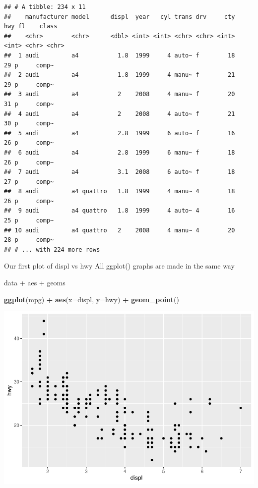 \documentclass[
]{article}
\newenvironment{Shaded}{\begin{snugshade}}{\end{snugshade}}
\newcommand{\DataTypeTok}[1]{\textcolor[rgb]{0.13,0.29,0.53}{#1}}
\newcommand{\KeywordTok}[1]{\textcolor[rgb]{0.13,0.29,0.53}{\textbf{#1}}}
\newcommand{\NormalTok}[1]{#1}
\newcommand{\OperatorTok}[1]{\textcolor[rgb]{0.81,0.36,0.00}{\textbf{#1}}}
\newcommand{\StringTok}[1]{\textcolor[rgb]{0.31,0.60,0.02}{#1}}
\begin{document}
\begin{verbatim}
## # A tibble: 234 x 11
##    manufacturer model      displ  year   cyl trans drv     cty   hwy fl    class
##    <chr>        <chr>      <dbl> <int> <int> <chr> <chr> <int> <int> <chr> <chr>
##  1 audi         a4           1.8  1999     4 auto~ f        18    29 p     comp~
##  2 audi         a4           1.8  1999     4 manu~ f        21    29 p     comp~
##  3 audi         a4           2    2008     4 manu~ f        20    31 p     comp~
##  4 audi         a4           2    2008     4 auto~ f        21    30 p     comp~
##  5 audi         a4           2.8  1999     6 auto~ f        16    26 p     comp~
##  6 audi         a4           2.8  1999     6 manu~ f        18    26 p     comp~
##  7 audi         a4           3.1  2008     6 auto~ f        18    27 p     comp~
##  8 audi         a4 quattro   1.8  1999     4 manu~ 4        18    26 p     comp~
##  9 audi         a4 quattro   1.8  1999     4 auto~ 4        16    25 p     comp~
## 10 audi         a4 quattro   2    2008     4 manu~ 4        20    28 p     comp~
## # ... with 224 more rows
\end{verbatim}

Our first plot of displ vs hwy All ggplot() graphs are made in the same
way

data + aes + geoms

\begin{Shaded}
\begin{Highlighting}[]
\KeywordTok{ggplot}\NormalTok{(mpg) }\OperatorTok{+}\StringTok{ }
\StringTok{  }\KeywordTok{aes}\NormalTok{(}\DataTypeTok{x=}\NormalTok{displ, }\DataTypeTok{y=}\NormalTok{hwy) }\OperatorTok{+}\StringTok{ }
\StringTok{  }\KeywordTok{geom_point}\NormalTok{()}
\end{Highlighting}
\end{Shaded}

\includegraphics{class05_files/figure-latex/unnamed-chunk-3-1.pdf}
\end{document}
